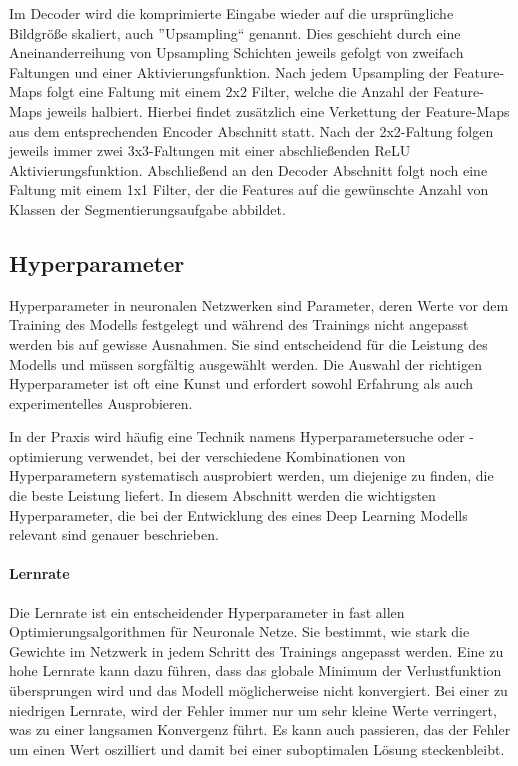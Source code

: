 Im Decoder wird die komprimierte Eingabe wieder auf die ursprüngliche Bildgröße skaliert, auch ''Upsampling`` genannt. Dies geschieht durch eine Aneinanderreihung von Upsampling Schichten jeweils gefolgt von zweifach Faltungen und einer Aktivierungsfunktion. Nach jedem Upsampling der Feature-Maps folgt eine Faltung mit einem 2x2 Filter, welche die Anzahl der Feature-Maps jeweils halbiert. Hierbei findet zusätzlich eine Verkettung der Feature-Maps aus dem entsprechenden Encoder Abschnitt statt. Nach der 2x2-Faltung folgen jeweils immer zwei 3x3-Faltungen mit einer abschließenden ReLU Aktivierungsfunktion. Abschließend an den Decoder Abschnitt folgt noch eine Faltung mit einem 1x1 Filter, der die Features auf die gewünschte Anzahl von Klassen der Segmentierungsaufgabe abbildet. \cite[vgl.][]{Ronneberger2015}

\subsection{Hyperparameter}
Hyperparameter in neuronalen Netzwerken sind Parameter, deren Werte vor dem Training des Modells festgelegt und während des Trainings nicht angepasst werden bis auf gewisse Ausnahmen. Sie sind entscheidend für die Leistung des Modells und müssen sorgfältig ausgewählt werden. Die Auswahl der richtigen Hyperparameter ist oft eine Kunst und erfordert sowohl Erfahrung als auch experimentelles Ausprobieren. 

In der Praxis wird häufig eine Technik namens Hyperparametersuche oder -optimierung verwendet, bei der verschiedene Kombinationen von Hyperparametern systematisch ausprobiert werden, um diejenige zu finden, die die beste Leistung liefert. In diesem Abschnitt werden die wichtigsten Hyperparameter, die bei der Entwicklung des eines Deep Learning \glspl{Modell} relevant sind genauer beschrieben.

\paragraph{Lernrate} Die Lernrate ist ein entscheidender Hyperparameter in fast allen Optimierungsalgorithmen für Neuronale Netze. Sie bestimmt, wie stark die Gewichte im Netzwerk in jedem Schritt des Trainings angepasst werden. Eine zu hohe Lernrate kann dazu führen, dass das globale Minimum der Verlustfunktion übersprungen wird und das \gls{Modell} möglicherweise nicht konvergiert. Bei einer zu niedrigen Lernrate, wird der Fehler immer nur um sehr kleine Werte verringert, was zu einer langsamen Konvergenz führt. Es kann auch passieren, das der Fehler um einen Wert oszilliert und damit bei einer suboptimalen Lösung steckenbleibt. \cite[vgl.][]{Pfannstiel2022}

